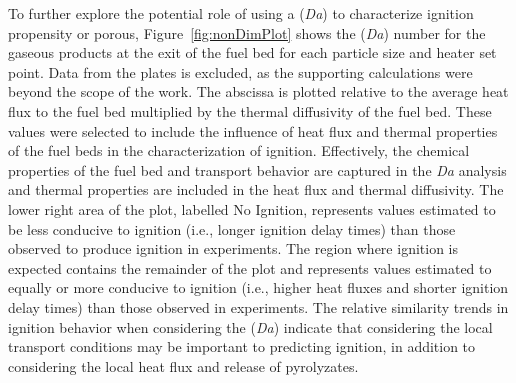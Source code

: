     To further explore the potential role of using a (\textit{Da}) to characterize ignition propensity or porous, Figure~\ref{fig:nonDimPlot} shows the (\textit{Da}) number for the gaseous products at the exit of the fuel bed for each particle size and heater set point. Data from the plates is excluded, as the supporting calculations were beyond the scope of the work.  The abscissa is plotted relative to the average heat flux to the fuel bed multiplied by the thermal diffusivity of the fuel bed. These values were selected to include the influence of heat flux and thermal properties of the fuel beds in the characterization of ignition. Effectively, the chemical properties of the fuel bed and transport behavior are captured in the \textit{Da} analysis and thermal properties are included in the heat flux and thermal diffusivity. The lower right area of the plot, labelled No Ignition, represents values estimated to be less conducive to ignition (i.e., longer ignition delay times) than those observed to produce ignition in experiments. The region where ignition is expected contains the remainder of the plot and represents values estimated to equally or more conducive to ignition (i.e., higher heat fluxes and shorter ignition delay times) than those observed in experiments. The relative similarity trends in ignition behavior when considering the (\textit{Da}) indicate that considering the local transport conditions may be important to predicting ignition, in addition to considering the local heat flux and release of pyrolyzates. 
        
